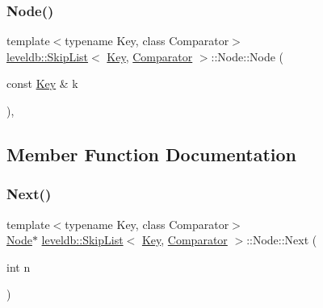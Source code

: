 \subsubsection{\texorpdfstring{Node()}{Node()}}
{\footnotesize\ttfamily template$<$typename Key, class Comparator$>$ \\
\mbox{\hyperlink{classleveldb_1_1_skip_list}{leveldb\+::\+Skip\+List}}$<$ \mbox{\hyperlink{namespaceleveldb_a7e9a9725b13fa0bd922d885280dfab95}{Key}}, \mbox{\hyperlink{structleveldb_1_1_comparator}{Comparator}} $>$\+::Node\+::\+Node (\begin{DoxyParamCaption}\item[{const \mbox{\hyperlink{namespaceleveldb_a7e9a9725b13fa0bd922d885280dfab95}{Key}} \&}]{k }\end{DoxyParamCaption})\hspace{0.3cm}{\ttfamily [inline]}, {\ttfamily [explicit]}}



\subsection{Member Function Documentation}
\mbox{\label{structleveldb_1_1_skip_list_1_1_node_aca7f18fc57f6c8e8a8dfe176eedbde74}} 
\subsubsection{\texorpdfstring{Next()}{Next()}}
{\footnotesize\ttfamily template$<$typename Key, class Comparator$>$ \\
\mbox{\hyperlink{structleveldb_1_1_skip_list_1_1_node}{Node}}$\ast$ \mbox{\hyperlink{classleveldb_1_1_skip_list}{leveldb\+::\+Skip\+List}}$<$ \mbox{\hyperlink{namespaceleveldb_a7e9a9725b13fa0bd922d885280dfab95}{Key}}, \mbox{\hyperlink{structleveldb_1_1_comparator}{Comparator}} $>$\+::Node\+::\+Next (\begin{DoxyParamCaption}\item[{int}]{n }\end{DoxyParamCaption})\hspace{0.3cm}{\ttfamily [inline]}}

\mbox{\label{structleveldb_1_1_skip_list_1_1_node_a96b7213d1fd9ef893f3a7baecc5c4801}} 
